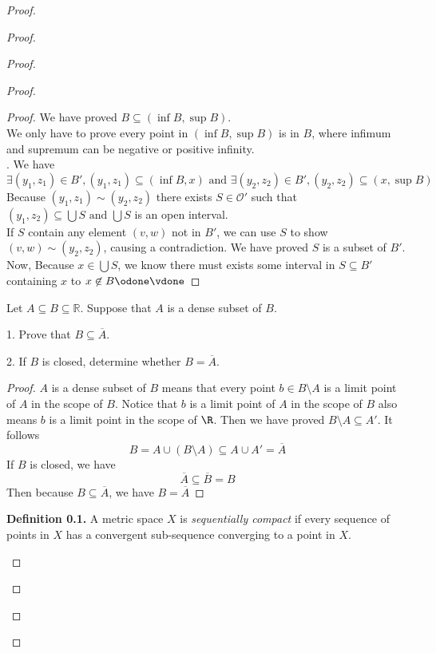 \documentclass{report}
\begin{document}
\begin{proof}
\begin{proof}
\begin{proof}
\begin{proof}
\begin{proof}
We have proved $B\subseteq (\inf B,\sup B)$.\\

We only have to prove every point in $(\inf B,\sup  B)$ is in $B$, where infimum and supremum can be negative or positive infinity.\\

. We have
\begin{equation*}
\exists (y_1,z_1)\in B', (y_1,z_1)\subseteq (\inf B,x)\text{ and }\exists (y_2,z_2)\in B', (y_2,z_2)\subseteq (x,\sup B)
\end{equation*}
Because $(y_1,z_1)\sim (y_2,z_2)$ there exists $S\in \mathcal{O}'$ such that $(y_1,z_2)\subseteq \bigcup S\text{ and }\bigcup S$ is an open interval.\\

If $S$ contain any element  $(v,w)$ not in $B'$, we can use  $S$ to show  $(v,w)\sim (y_2,z_2)$, causing a contradiction. We have proved $S$ is a subset of  $B'$.\\

Now, Because $x\in \bigcup S$, we know there must exists some interval in $S\subseteq B'$ containing  $x$  \CaC to $x\not\in B\odone\vdone$
\end{proof}
\begin{question}{}{}
Let \( A \subseteq B \subseteq \mathbb{R} \). Suppose that \( A \) is a dense subset of \( B \).

1. Prove that \( B \subseteq \overline{A} \).

2. If \( B \) is closed, determine whether \( B = \overline{A} \).
\end{question}
\begin{proof}
$A$ is a dense subset of $B$ means that every point $b\in B\setminus A$ is a limit point of $A$ in the scope of $B$. Notice that $b$ is a limit point of  $A$ in the scope of $B$ also means $b$ is a limit point in the scope of $\R$. Then we have proved $B\setminus A\subseteq A'$. It follows
\begin{equation*}
B=A \cup (B\setminus A)\subseteq A\cup A'=\overline{A}
\end{equation*}
If $B$ is closed, we have
 \begin{equation*}
\overline{A}\subseteq \overline{B}=B
\end{equation*}
Then because $B\subseteq \overline{A}$, we have $B=\overline{A}$



\end{proof}
\textbf{Definition 0.1.} A metric space \( X \) is \textit{sequentially compact} if every sequence of points in \( X \) has a convergent sub-sequence converging to a point in \( X \).
\begin{question}{}{}


\end{question}
\end{proof}
\end{proof}
\end{proof}
\end{proof}
\end{document}
